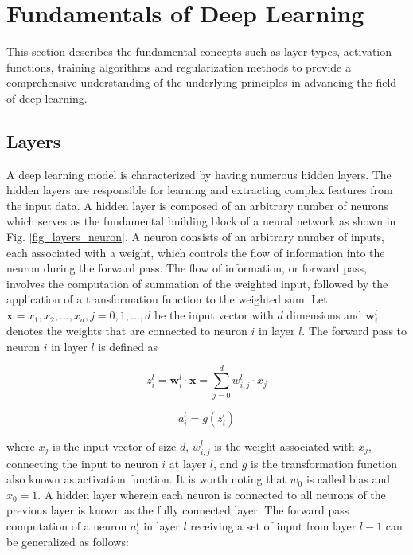 \documentclass[preprint,12pt]{elsarticle}
\begin{document}
\section{Fundamentals of Deep Learning}\label{sec2}
This section describes the fundamental concepts such as layer types, activation functions, training algorithms and regularization methods to provide a comprehensive understanding of the underlying principles in advancing the field of deep learning.

\subsection{Layers}
A deep learning model is characterized by having numerous hidden layers. The hidden layers are responsible for learning and extracting complex features from the input data. A hidden layer is composed of an arbitrary number of neurons which serves as the fundamental building block of a neural network as shown in Fig. \ref{fig_layers_neuron}. A neuron consists of an arbitrary number of inputs, each associated with a weight, which controls the flow of information into the neuron during the forward pass. The flow of information, or forward pass, involves the computation of summation of the weighted input, followed by the application of a transformation function to the weighted sum. Let $\mathbf{x} = {x_1, x_2, ...,x_d}, j=0,1,...,d$ be the input vector with $d$ dimensions and $\mathbf{w}_i^l$ denotes the weights that are connected to neuron $i$ in layer $l$. The forward pass to neuron $i$ in layer $l$ is defined as  

\begin{equation}
z_i^l=\mathbf{w}^{l}_i \cdot \mathbf{x}=\sum_{j=0}^{d} w_{i,j}^{l} \cdot x_{j}
\end{equation}

\begin{equation}
a_i^l=g(z_i^l)
\end{equation}

\noindent where $x_{j}$ is the input vector of size $d$, $w_{i,j}^{l}$ is the weight associated with $x_j$, connecting the input to neuron $i$ at layer $l$, and $g$ is the transformation function also known as activation function. It is worth noting that $w_0$ is called bias and $x_0=1$. A hidden layer wherein each neuron is connected to all neurons of the previous layer is known as the fully connected layer. The forward pass computation of a neuron $a_i^{l}$ in layer $l$ receiving a set of input from layer $l-1$  can be generalized as follows:
\end{document}
